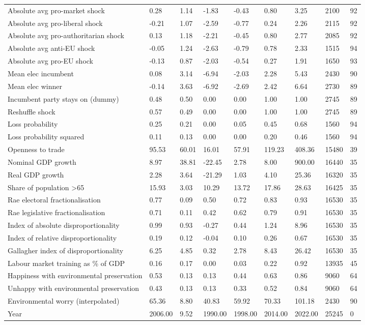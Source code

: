 \begin{longtable}{lllllllll}
Absolute avg pro-market shock & 0.28 & 1.14 & -1.83 & -0.43 & 0.80 & 3.25 & 2100 & 92\\
Absolute avg pro-liberal shock & -0.21 & 1.07 & -2.59 & -0.77 & 0.24 & 2.26 & 2115 & 92\\
Absolute avg pro-authoritarian shock & 0.13 & 1.18 & -2.21 & -0.45 & 0.80 & 2.77 & 2085 & 92\\
\addlinespace
Absolute avg anti-EU shock & -0.05 & 1.24 & -2.63 & -0.79 & 0.78 & 2.33 & 1515 & 94\\
Absolute avg pro-EU shock & -0.13 & 0.87 & -2.03 & -0.54 & 0.27 & 1.91 & 1650 & 93\\
Mean elec incumbent & 0.08 & 3.14 & -6.94 & -2.03 & 2.28 & 5.43 & 2430 & 90\\
Mean elec winner & -0.14 & 3.63 & -6.92 & -2.69 & 2.42 & 6.64 & 2730 & 89\\
Incumbent party stays on (dummy) & 0.48 & 0.50 & 0.00 & 0.00 & 1.00 & 1.00 & 2745 & 89\\
\addlinespace
Reshuffle shock & 0.57 & 0.49 & 0.00 & 0.00 & 1.00 & 1.00 & 2745 & 89\\
Loss probability & 0.25 & 0.21 & 0.00 & 0.05 & 0.45 & 0.68 & 1560 & 94\\
Loss probability squared & 0.11 & 0.13 & 0.00 & 0.00 & 0.20 & 0.46 & 1560 & 94\\
Openness to trade & 95.53 & 60.01 & 16.01 & 57.91 & 119.23 & 408.36 & 15480 & 39\\
Nominal GDP growth & 8.97 & 38.81 & -22.45 & 2.78 & 8.00 & 900.00 & 16440 & 35\\
\addlinespace
Real GDP growth & 2.28 & 3.64 & -21.29 & 1.03 & 4.10 & 25.36 & 16320 & 35\\
Share of population >65 & 15.93 & 3.03 & 10.29 & 13.72 & 17.86 & 28.63 & 16425 & 35\\
Rae electoral fractionalisation & 0.77 & 0.09 & 0.50 & 0.72 & 0.83 & 0.93 & 16530 & 35\\
Rae legislative fractionalisation & 0.71 & 0.11 & 0.42 & 0.62 & 0.79 & 0.91 & 16530 & 35\\
Index of absolute disproportionality & 0.99 & 0.93 & -0.27 & 0.44 & 1.24 & 8.96 & 16530 & 35\\
\addlinespace
Index of relative disproportionality & 0.19 & 0.12 & -0.04 & 0.10 & 0.26 & 0.67 & 16530 & 35\\
Gallagher index of disproportionality & 6.25 & 4.85 & 0.32 & 2.78 & 8.43 & 26.42 & 16530 & 35\\
Labour market training as \% of GDP & 0.16 & 0.17 & 0.00 & 0.03 & 0.22 & 0.92 & 13935 & 45\\
Happiness with environmental preservation & 0.53 & 0.13 & 0.13 & 0.44 & 0.63 & 0.86 & 9060 & 64\\
Unhappy with environmental preservation & 0.43 & 0.13 & 0.13 & 0.33 & 0.52 & 0.84 & 9060 & 64\\
\addlinespace
Environmental worry (interpolated) & 65.36 & 8.80 & 40.83 & 59.92 & 70.33 & 101.18 & 2430 & 90\\
Year & 2006.00 & 9.52 & 1990.00 & 1998.00 & 2014.00 & 2022.00 & 25245 & 0\\
\bottomrule
\end{longtable}
